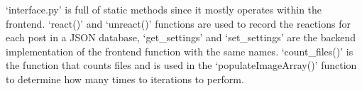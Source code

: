 \documentclass[12pt]{report}
\begin{document}
\begin{appendices}
`interface.py' is full of static methods since it mostly operates within the frontend. `react()' and `unreact()' functions
are used to record the reactions for each post in a JSON database, `get\_settings' and `set\_settings' are the backend
implementation of the frontend function with the same names. `count\_files()' is the function that counts files and is used
in the `populateImageArray()' function to determine how many times to iterations to perform.

\end{appendices}

\end{document}
